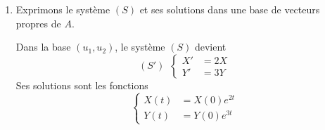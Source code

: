 {{\begin {enumerate}
$$\begin{pmatrix}4&-2 \\ 1&1 \\ \end{pmatrix}\begin{pmatrix}x \\  y\end{pmatrix}=
\begin{pmatrix}2x \\  2y\end{pmatrix}\iff x=y,$$
d'o\`u le vecteur propre $u_1=(1,1)$ associ\'e \`a la valeur propre $\lambda_1=2$ . 
$$\begin{pmatrix}4&-2 \\ 1&1 \\ \end{pmatrix}\begin{pmatrix}x \\  y\end{pmatrix}=
\begin{pmatrix}3x \\  3y\end{pmatrix}\iff x=2y,$$
d'o\`u le vecteur propre $u_2=(2,1)$ associ\'e \`a la valeur propre $\lambda_2=3$ .
Dans la base $(u_1, u_2)$, la matrice s'\'ecrit
$$A'=\begin{pmatrix}2&0 \\ 0&3 \\ \end{pmatrix}.$$
On a $A=PA'P^{-1}$ o\`u
$$P=\begin{pmatrix}1&2 \\ 1&1 \\  \end{pmatrix}\ {\hbox{et}}\ P^{-1}=\begin{pmatrix}-1&2 \\ 1&-1 \\ \end{pmatrix}.$$
  \item Exprimons le syst\`eme $(S)$ et ses solutions dans une base de vecteurs propres de $A$.

Dans la base $(u_1, u_2)$, le syst\`eme $(S)$ devient
$$(S')\ \ \left\{\begin{align*}X'&= 2X \\  Y'&= 3Y\end{align*}\right.$$
Ses solutions sont les fonctions
$$\left\{\begin{align*}X(t)&= X(0)e^{2t} \\  Y(t)&=Y(0)e^{3t}\end{align*}\right.$$


\end{enumerate}}}

